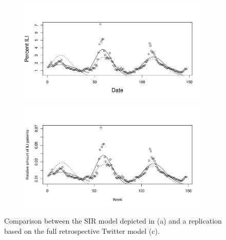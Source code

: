\documentclass[11pt, a4paper,twoside]{report}\usepackage[]{graphicx}\usepackage[]{color}
\begin{document}
\begin{figure}[htbp!]
\centering
  \begin{subfigure}[t]{1\textwidth}
  \includegraphics[width=1\linewidth]{02_todd_bodnar_SIR.pdf}
  \caption{}
  \label{fig:SIR_comparison_original}
  \end{subfigure}

  \begin{subfigure}[t]{1\textwidth}
  \includegraphics[width=1\linewidth]{39_SIR_model_full_model_25.pdf}
  \caption{}
  \label{fig:SIR_comparison_full}
  \end{subfigure}
  \caption{Comparison between the SIR model depicted in \cite{bodnar_data_2015} (a) and a replication based on the full retrospective Twitter model (c).}
    \label{fig:SIR_comparison_CDC_full_model}
\end{figure}
\end{document}
